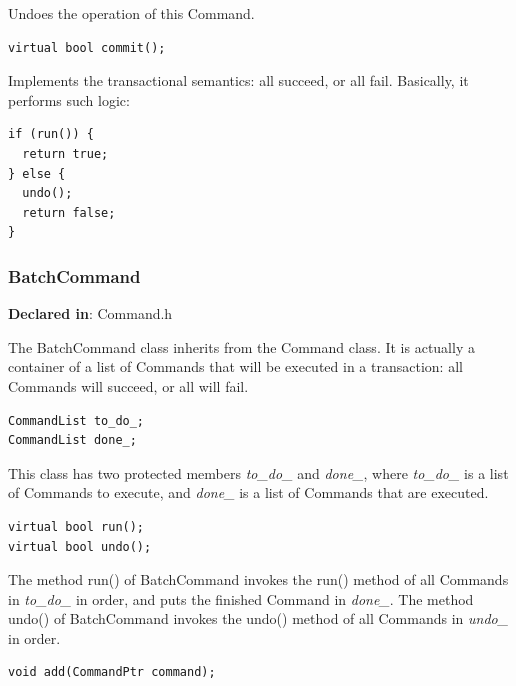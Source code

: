 \documentclass[11pt]{article}
\begin{document}
Undoes the operation of this Command.


\begin{verbatim}
virtual bool commit();

\end{verbatim}



Implements the transactional semantics: all succeed, or all fail. Basically, it
performs such logic:

\begin{verbatim}
if (run()) {
  return true;
} else {
  undo();
  return false;
}

\end{verbatim}



\subsubsection{BatchCommand}
\label{sec-3.2.4}

\textbf{Declared in}: Command.h

The BatchCommand class inherits from the Command class. It is actually a
container of a list of Commands that will be executed in a transaction: all
Commands will succeed, or all will fail.


\begin{verbatim}
CommandList to_do_;
CommandList done_;

\end{verbatim}



This class has two protected members \emph{to\_do\_} and \emph{done\_}, where \emph{to\_do\_}
is a list of Commands to execute, and \emph{done\_} is a list of Commands that are
executed.


\begin{verbatim}
virtual bool run();
virtual bool undo();

\end{verbatim}



The method run() of BatchCommand invokes the run() method of all Commands in
\emph{to\_do\_} in order, and puts the finished Command in \emph{done\_}. The method
undo() of BatchCommand invokes the undo() method of all Commands in \emph{undo\_} in
order.


\begin{verbatim}
void add(CommandPtr command);

\end{verbatim}
\end{document}
